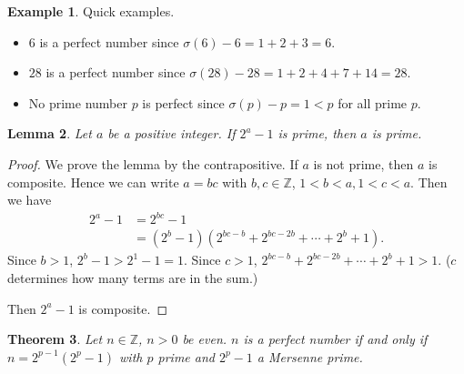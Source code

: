 \documentclass{amsbook}
\theoremstyle{plain}
\newtheorem{theorem}{Theorem}[chapter] %
\newtheorem{lemma}[theorem]{Lemma}
\theoremstyle{definition}
\newtheorem{example}[theorem]{Example}
\theoremstyle{remark}
\numberwithin{equation}{chapter}
\numberwithin{figure}{chapter}
\newcommand{\Z}{\mathbb{Z}}
\begin{document}
\begin{example} 
Quick examples.
\begin{itemize}
\item  $6$ is a perfect number since $\sigma(6) - 6 = 1 + 2 + 3 = 6$. 
\item $28$ is a perfect number since $\sigma(28) - 28 = 1 + 2 + 4 + 7 + 14 = 28$.
\item No prime number $p$ is perfect since $\sigma (p) - p = 1 < p$ for all prime $p$. 
\end{itemize}
\end{example}

\begin{lemma}\label{lem:lem1_day24}
  Let $a$ be a positive integer. If $2^a - 1$ is prime, then $a$ is prime. 
\end{lemma}
\begin{proof}
We prove the lemma by the contrapositive. If $a$ is not prime, then $a$ is composite. Hence we can write $a = bc$ with $b, c \in \Z$, $1 < b < a, 1< c < a$. Then we have 
\begin{align}
  2^a - 1 &= 2^{bc} - 1 \\
          &= (2^b - 1)(2^{bc - b} + 2^{bc - 2b} + \cdots + 2^b + 1).
\end{align}
Since $b > 1$, $2^b - 1 > 2^1 - 1 = 1$. Since $c > 1$, $2^{bc - b} + 2^{bc - 2b} + \cdots + 2^b + 1 > 1$. ($c$ determines how many terms are in the sum.)

Then $2^a - 1$ is composite. 
\end{proof}
\begin{theorem}\label{thm:perfect_mersenne}
  Let $n \in \Z$, $n > 0$ be even. $n$ is a perfect number if and only if $n = 2^{p-1}(2^p-1)$ with $p$ prime and $2^p-1$ a Mersenne prime.
\end{theorem}
\end{document}
